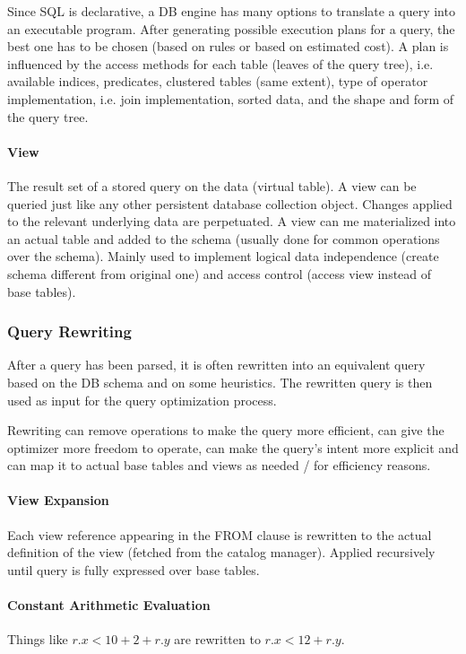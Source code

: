 Since SQL is declarative, a DB engine has many options to translate a query into an executable program. After generating possible execution plans for a query, the best one has to be chosen (based on rules or based on estimated cost). A plan is influenced by the access methods for each table (leaves of the query tree), i.e. available indices, predicates, clustered tables (same extent), type of operator implementation, i.e. join implementation, sorted data, and the shape and form of the query tree.

\paragraph{View}
The result set of a stored query on the data (virtual table). A view can be queried just like any other persistent database collection object. Changes applied to the relevant underlying data are perpetuated. A view can me materialized into an actual table and added to the schema (usually done for common operations over the schema). Mainly used to implement logical data independence (create schema different from original one) and access control (access view instead of base tables).





\subsubsection{Query Rewriting}

After a query has been parsed, it is often rewritten into an equivalent query based on the DB schema and on some heuristics. The rewritten query is then used as input for the query optimization process. 

Rewriting can remove operations to make the query more efficient, can give the optimizer more freedom to operate, can make the query's intent more explicit and can map it to actual base tables and views as needed / for efficiency reasons.


\paragraph{View Expansion}
Each view reference appearing in the FROM clause is rewritten to the actual definition of the view (fetched from the catalog manager). Applied recursively until query is fully expressed over base tables.

\paragraph{Constant Arithmetic Evaluation}
Things like $r.x < 10 + 2 + r.y$ are rewritten to $r.x < 12 + r.y$.


